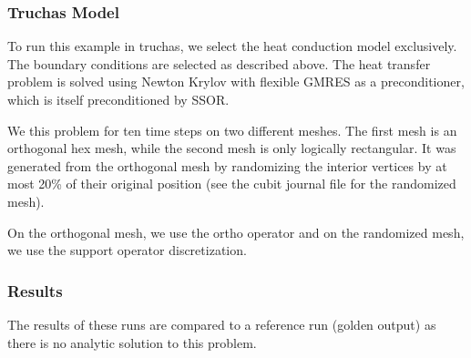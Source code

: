 \documentclass[12pt]{article}
\begin{document}
\subsubsection*{Truchas Model}

To run this example in truchas, we select the heat conduction model
exclusively. The boundary conditions are selected as described above.
The heat transfer problem is solved using Newton Krylov with flexible
GMRES as a preconditioner, which is itself preconditioned by SSOR.

We this problem for ten time steps on two different meshes. The
first mesh is an orthogonal hex mesh, while the second mesh is only
logically rectangular. It was generated from the orthogonal mesh by
randomizing the interior vertices by at most 20\% of their original
position (see the cubit journal file for the randomized mesh).

On the orthogonal mesh, we use the ortho operator and on the
randomized mesh, we use the support operator discretization.


\subsubsection*{Results}

The results of these runs are compared to a reference run (golden
output) as there is no analytic solution to this problem.
\end{document}
